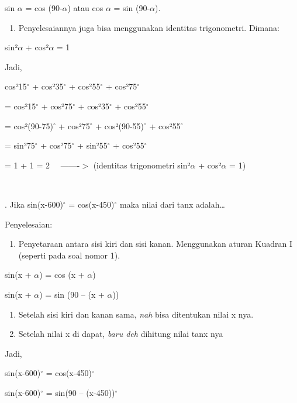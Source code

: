 \documentclass[11pt,fleqn]{book} %
\begin{document}
\begin{myEnumerate}
\begin{itemize}
\noindent sin $\alpha$ = cos (90-$\alpha$) atau cos $\alpha$ = sin (90-$\alpha$).

\begin{enumerate}
\item  Penyelesaiannya juga bisa menggunakan identitas trigonometri. Dimana:
\end{enumerate}

\noindent sin²$\alpha$ + cos²$\alpha$ = 1

\noindent Jadi,

\noindent cos²15${}^\circ$ + cos²35${}^\circ$ + cos²55${}^\circ$ + cos²75${}^\circ$

\noindent = cos²15${}^\circ$ + cos²75${}^\circ$ + cos²35${}^\circ$ + cos²55${}^\circ$

\noindent = cos²(90-75)${}^\circ$ + cos²75${}^\circ$ + cos²(90-55)${}^\circ$ + cos²55${}^\circ$

\noindent = sin²75${}^\circ$ + cos²75${}^\circ$ + sin²55${}^\circ$ + cos²55${}^\circ$

\noindent = 1 + 1 = 2~~ -------$>$ (identitas trigonometri sin²$\alpha$ + cos²$\alpha$ = 1)

\noindent ~

. Jika sin(x-600)${}^\circ$ = cos(x-450)${}^\circ$ maka nilai dari tanx adalah{\dots}

\noindent Penyelesaian:

\begin{enumerate}
\item  Penyetaraan antara sisi kiri dan sisi kanan. Menggunakan aturan Kuadran I (seperti pada soal nomor 1).
\end{enumerate}

\noindent sin(x + $\alpha$) = cos (x + $\alpha$)

\noindent sin(x + $\alpha$) = sin (90 -- (x + $\alpha$))

\begin{enumerate}
\item  Setelah sisi kiri dan kanan sama, \textit{nah} bisa ditentukan nilai x nya.

\item  Setelah nilai x di dapat, \textit{baru deh} dihitung nilai tanx nya
\end{enumerate}

\noindent Jadi,

\noindent sin(x-600)${}^\circ$ = cos(x-450)${}^\circ$

\noindent sin(x-600)${}^\circ$ = sin(90 -- (x-450))${}^\circ$


\end{itemize}
\end{myEnumerate}
\end{document}

